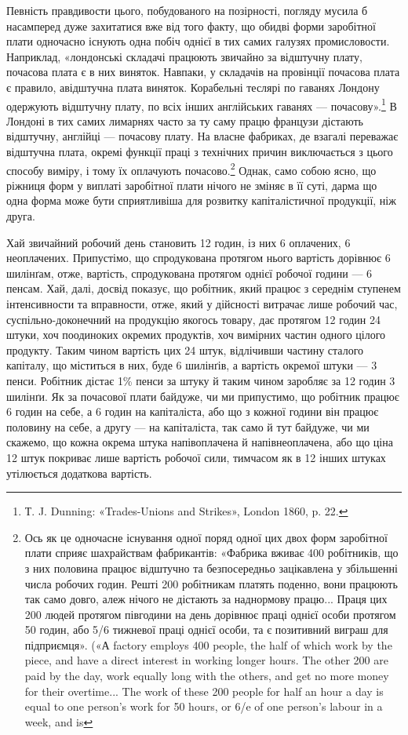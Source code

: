 Певність правдивости цього, побудованого на позірності, погляду
мусила б насамперед дуже захитатися вже від того факту,
що обидві форми заробітної плати одночасно існують одна побіч
однієї в тих самих галузях промисловости. Наприклад, «лондонські
складачі працюють звичайно за відштучну плату, почасова
плата є в них виняток. Навпаки, у складачів на провінції
почасова плата є правило, авідштучна плата виняток. Корабельні
теслярі по гаванях Лондону одержують відштучну плату, по
всіх інших англійських гаванях — почасову».\footnote{
Т. J. Dunning: «Trades-Unions and Strikes», London 1860,
p. 22.
} В Лондоні в
тих самих лимарнях часто за ту саму працю французи дістають
відштучну, англійці — почасову плату. На власне фабриках,
де взагалі переважає відштучна плата, окремі функції праці з
технічних причин виключається з цього способу виміру, і тому
їх оплачують почасово.\footnote{
Ось як це одночасне існування одної поряд одної цих двох форм
заробітної плати сприяє шахрайствам фабрикантів: «Фабрика вживає
400 робітників, що з них половина працює відштучно та безпосередньо
зацікавлена у збільшенні числа робочих годин. Решті 200 робітникам
платять поденно, вони працюють так само довго, алеж нічого не дістають
за наднормову працю... Праця цих 200 людей протягом півгодини
на день дорівнює праці однієї особи протягом 50 годин, або 5/6 тижневої
праці однієї особи, та є позитивний виграш для підприємця». («А factory
employs 400 people, the half of which work by the piece, and have a direct
interest in working longer hours. The other 200 are paid by the day,
work equally long with the others, and get no more money for their overtime...
The work of these 200 people for half an hour a day is equal to one
person’s work for 50 hours, or 6/e of one person’s labour in a week, and is
} Однак, само собою ясно, що ріжниця
форм у виплаті заробітної плати нічого не зміняє в її суті, дарма
що одна форма може бути сприятливіша для розвитку капіталістичної
продукції, ніж друга.

Хай звичайний робочий день становить 12 годин, із них 6
оплачених, 6 неоплачених. Припустімо, що спродукована протягом
нього вартість дорівнює 6 шилінґам, отже, вартість, спродукована
протягом однієї робочої години — 6 пенсам. Хай,
далі, досвід показує, що робітник, який працює з середнім
ступенем інтенсивности та вправности, отже, який у дійсності
витрачає лише робочий час, суспільно-доконечний на продукцію
якогось товару, дає протягом 12 годин 24 штуки, хоч поодиноких
окремих продуктів, хоч вимірних частин одного цілого продукту.
Таким чином вартість цих 24 штук, відлічивши частину
сталого капіталу, що міститься в них, буде 6 шилінґів, а вартість
окремої штуки — 3 пенси. Робітник дістає 1\% пенси за
штуку й таким чином заробляє за 12 годин 3 шилінґи. Як за
почасової плати байдуже, чи ми припустимо, що робітник працює
6 годин на себе, а 6 годин на капіталіста, або що з кожної години
він працює половину на себе, а другу — на капіталіста, так само
й тут байдуже, чи ми скажемо, що кожна окрема штука напівоплачена
й напівнеоплачена, або що ціна 12 штук покриває лише
вартість робочої сили, тимчасом як в 12 інших штуках утілюється
додаткова вартість.

